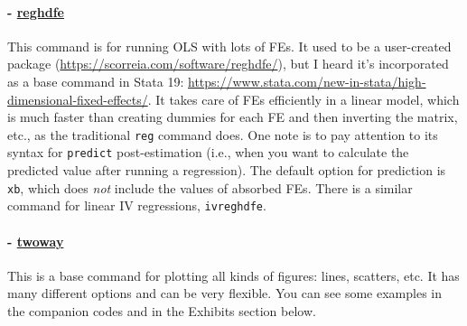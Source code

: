\paragraph{- \underline{reghdfe}} This command is for running OLS with lots of FEs. It used to be a user-created package (\url{https://scorreia.com/software/reghdfe/}), but I heard it's incorporated as a base command in Stata 19: \url{https://www.stata.com/new-in-stata/high-dimensional-fixed-effects/}. It takes care of FEs efficiently in a linear model, which is much faster than creating dummies for each FE and then inverting the matrix, etc., as the traditional \verb|reg| command does. One note is to pay attention to its syntax for \verb|predict| post-estimation (i.e., when you want to calculate the predicted value after running a regression). The default option for prediction is \verb|xb|, which does \textit{not} include the values of absorbed FEs. There is a similar command for linear IV regressions, \verb|ivreghdfe|.

\paragraph{- \underline{twoway}} This is a base command for plotting all kinds of figures: lines, scatters, etc. It has many different options and can be very flexible. You can see some examples in the companion codes and in the Exhibits section below. 

